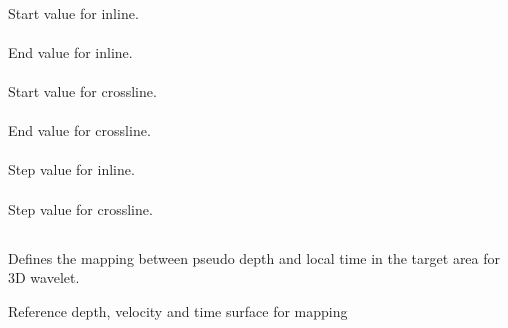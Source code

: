 \paragraph{}
 \slist
   \item \Description Start value for inline.
   \item \Argument
   \item \Default
 \elist
\paragraph{}
 \slist
   \item \Description End value for inline.
   \item \Argument
   \item \Default
 \elist
\paragraph{}
 \slist
   \item \Description Start value for crossline.
   \item \Argument
   \item \Default
 \elist
\paragraph{}
 \slist
   \item \Description End value for crossline.
   \item \Argument
   \item \Default
 \elist
\paragraph{}
 \slist
   \item \Description Step value for inline.
   \item \Argument
   \item \Default
 \elist
\paragraph{}
 \slist
   \item \Description Step value for crossline.
   \item \Argument
   \item \Default
 \elist


\subsection{} 
 \slist
   \item \Description Defines the mapping between pseudo depth and local time in the target area for 3D wavelet.
   \item \Argument Reference depth, velocity and time surface for mapping
   \item \Default
 \elist

